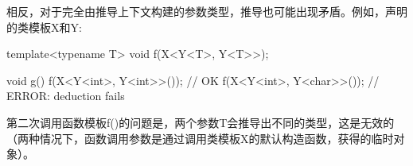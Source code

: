 相反，对于完全由推导上下文构建的参数类型，推导也可能出现矛盾。例如，声明的类模板X和Y:

\begin{cpp}
template<typename T>
void f(X<Y<T>, Y<T>>);

void g() {
	f(X<Y<int>, Y<int>>()); // OK
	f(X<Y<int>, Y<char>>()); // ERROR: deduction fails
}
\end{cpp}

第二次调用函数模板f()的问题是，两个参数T会推导出不同的类型，这是无效的（两种情况下，函数调用参数是通过调用类模板X的默认构造函数，获得的临时对象）。
































